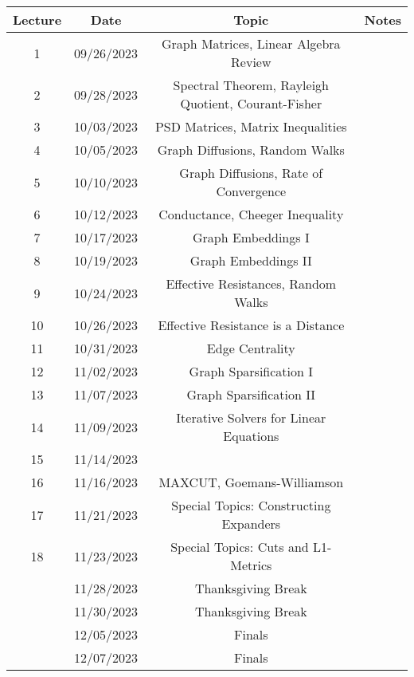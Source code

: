 \begin{table}[ht]
    \centering
    \begin{tabular}{|c|c|c|c|}
    \hline
        \textbf{Lecture} & \textbf{Date} &\textbf{Topic} & \textbf{Notes}\\ \hline
        1 & 09/26/2023 & Graph Matrices, Linear Algebra Review & \\ \hline
        2 & 09/28/2023 & Spectral Theorem, Rayleigh Quotient, Courant-Fisher & \\ \hline
        3 & 10/03/2023 & PSD Matrices, Matrix Inequalities & \\ \hline
        4 & 10/05/2023 & Graph Diffusions, Random Walks & \\ \hline
        5 & 10/10/2023 & Graph Diffusions, Rate of Convergence & \\ \hline
        6 & 10/12/2023 & Conductance, Cheeger Inequality & \\ \hline
        7 & 10/17/2023 & Graph Embeddings I & \\ \hline
        8 & 10/19/2023 & Graph Embeddings II & \\ \hline
        9 & 10/24/2023 & Effective Resistances, Random Walks & \\ \hline
        10 & 10/26/2023 & Effective Resistance is a Distance & \\ \hline
        11 & 10/31/2023 & Edge Centrality & \\ \hline
        12 & 11/02/2023 & Graph Sparsification I & \\ \hline
        13 & 11/07/2023 & Graph Sparsification II & \\ \hline
        14 & 11/09/2023 & Iterative Solvers for Linear Equations & \\ \hline
        15 & 11/14/2023 &  & \\ \hline
        16 & 11/16/2023 & MAXCUT, Goemans-Williamson & \\ \hline
        17 & 11/21/2023 & Special Topics: Constructing Expanders & \\ \hline
        18 & 11/23/2023 & Special Topics: Cuts and L1-Metrics & \\ \hline
         & 11/28/2023 & Thanksgiving Break & \\ \hline
         & 11/30/2023 & Thanksgiving Break & \\ \hline
         & 12/05/2023 & Finals & \\ \hline
         & 12/07/2023 & Finals & \\ \hline
    \end{tabular}
\end{table}
